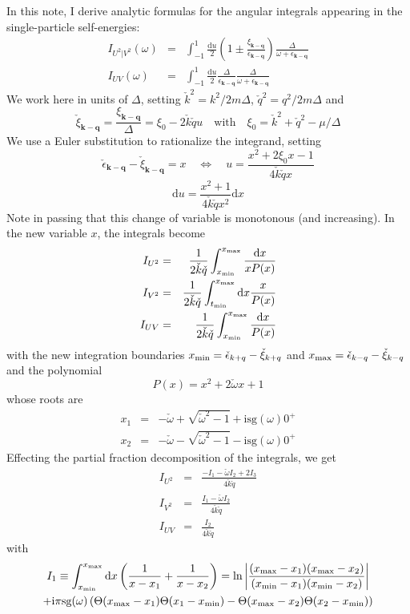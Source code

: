\documentclass[10pt,a4paper,a4wide]{article}
\newcommand{\be}{\begin{equation}}
\newcommand{\ee}{\end{equation}}
\newcommand{\bea}{\begin{eqnarray}}
\newcommand{\eea}{\end{eqnarray}}
\newcommand{\kk}{\mathbf{k}}
\newcommand{\qq}{\mathbf{q}}
\newcommand{\ii}{\mathrm{i}}
\newcommand{\dd}{\mathrm{d}}
\newcommand{\bb}[1]{\left( #1 \right)}
\begin{document}
In this note, I derive analytic formulas for the angular integrals appearing in the single-particle self-energies:
\bea
I_{U^2|V^2}(\omega)&=&\int_{-1}^1 \frac{\dd u}{2}\bb{1\pm\frac{\xi_{\kk-\qq}}{\epsilon_{\kk-\qq}}} \frac{\Delta}{\omega+\epsilon_{\kk-\qq}}\\ 
I_{UV}(\omega)&=&\int_{-1}^1 \frac{\dd u}{2}{\frac{\Delta}{\epsilon_{\kk-\qq}}} \frac{\Delta}{\omega+\epsilon_{\kk-\qq}} 
\eea
We work here in units of $\Delta$, setting $\check k^2=k^2/2m\Delta$, $\check q^2=q^2/2m\Delta$ and
\be
\check{\xi}_{\kk-\qq}=\frac{{\xi}_{\kk-\qq}}{\Delta}=\xi_0-2\check k \check q u \quad \text{with} \quad  \xi_0=\check k^2+\check q^2-\mu/\Delta
\ee
We use a Euler substitution to rationalize the integrand, setting
\be
\check{\epsilon}_{\kk-\qq}-\check{\xi}_{\kk-\qq}=x \quad \Longleftrightarrow \quad u=\frac{x^2+2\xi_0 x-1}{4\check k\check q x} 
\ee
\be
\dd u = \frac{x^2+1}{4\check k\check q x^2} \dd x
\ee
Note in passing that this change of variable is monotonous (and increasing).
In the new variable $x$, the integrals become
\bea
I_{U^2}&=&\frac{1}{2\check k\check q }\int_{x_{\rm min}}^{x_{\rm max}}  \frac{\dd x}{xP(x)}\\ 
I_{V^2}&=&\frac{1}{2\check k\check q }\int_{t_{\rm min}}^{x_{\rm max}} \dd x \frac{x}{P(x)} \\
I_{UV}&=&\frac{1}{2\check k\check q  }\int_{x_{\rm min}}^{x_{\rm max}} \frac{\dd x}{P(x)}
\eea
with the new integration boundaries $x_{\rm min}=\check\epsilon_{k+q}-\check\xi_{k+q}$ and $x_{\rm max}=\check\epsilon_{k-q}-\check\xi_{k-q}$ and the polynomial
\be
P(x)=x^2+2\check\omega x+1
\ee
whose roots are
\bea
x_1 &=& -\check\omega+\sqrt{\check\omega^2-1} +\ii\text{sg}(\omega)0^+\\
x_2 &=& -\check\omega-\sqrt{\check\omega^2-1}  -\ii\text{sg}(\omega)0^+
\eea
Effecting the partial fraction decomposition of the integrals, we get
\bea
I_{U^2}&=&\frac{-I_1 -\check\omega I_2 +2I_3}{4\check k\check q}  \\ 
I_{V^2}&=& \frac{I_1-\check\omega I_2}{4\check k\check q}  \\
I_{UV}&=& \frac{I_2}{4\check k\check q } 
\eea
with
\begin{multline}
I_1\equiv \int_{x_{\rm min}}^{x_{\rm max}} \dd x \bb{\frac{1}{x-x_1}+\frac{1}{x-x_2}} =\text{ln} \left\vert\frac{(x_{\rm max}-x_1)(x_{\rm max}-x_2)}{(x_{\rm min}-x_1)(x_{\rm min}-x_2)}\right\vert\\+\ii\pi \text{sg}(\omega)\bb{\Theta(x_{\rm max}-x_1)\Theta(x_1-x_{\rm min})-\Theta(x_{\rm max}-x_2)\Theta(x_2-x_{\rm min})}
\end{multline}
\end{document}
